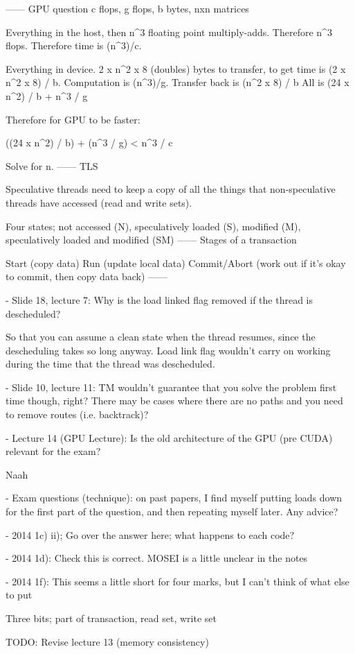 ------
GPU question
c flops, g flops, b bytes, nxn matrices

Everything in the host, then n^3 floating point multiply-adds. Therefore n^3 flops. Therefore time is (n^3)/c.

Everything in device. 2 x n^2 x 8 (doubles) bytes to transfer, to get time is (2 x n^2 x 8) / b.
Computation is (n^3)/g.
Transfer back is (n^2 x 8) / b
All is (24 x n^2) / b + n^3 / g

Therefore for GPU to be faster:

((24 x n^2) / b) + (n^3 / g) < n^3 / c

Solve for n.
------
TLS

Speculative threads need to keep a copy of all the things that
non-speculative threads have accessed (read and write sets).

Four states; not accessed (N), speculatively loaded (S), modified (M),
speculatively loaded and modified (SM)
------
Stages of a transaction

Start (copy data)
Run (update local data)
Commit/Abort (work out if it's okay to commit, then copy data back)
------


- Slide 18, lecture 7: Why is the load linked flag removed if the
thread is descheduled?

So that you can assume a clean state when the thread resumes, since
the descheduling takes so long anyway. Load link flag wouldn't carry
on working during the time that the thread was descheduled.

- Slide 10, lecture 11: TM wouldn't guarantee that you solve the
problem first time though, right? There may be cases where there are
no paths and you need to remove routes (i.e. backtrack)?

- Lecture 14 (GPU Lecture): Is the old architecture of the GPU (pre
CUDA) relevant for the exam?

Naah

- Exam questions (technique): on past papers, I find myself putting
loads down for the first part of the question, and then repeating
myself later. Any advice?

- 2014 1c) ii); Go over the answer here; what happens to each code?



- 2014 1d): Check this is correct. MOSEI is a little unclear in the notes



- 2014 1f): This seems a little short for four marks, but I can't
think of what else to put

Three bits; part of transaction, read set, write set


TODO: Revise lecture 13 (memory consistency)
